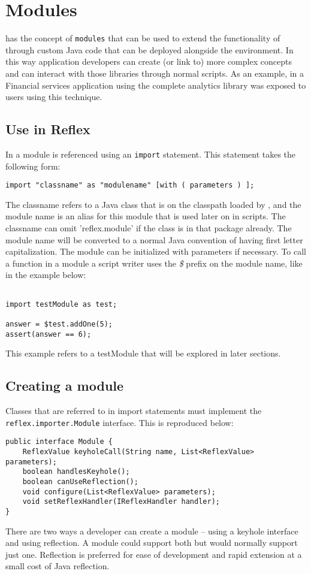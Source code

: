 \chapter{Modules}
\Reflex has the concept of \Verb+modules+ that can be used to extend the functionality of \Reflex through custom Java code that can be deployed alongside the environment. In this way application developers can create (or link to) more complex concepts and can interact with those libraries through normal \Reflex scripts. As an example, in a Financial services application using \Reflex the complete analytics library was exposed to \Reflex users using this technique.

\section{Use in Reflex}
In \Reflex a module is referenced using an \Verb+import+ statement. This statement takes the following form:
\begin{Verbatim}
import "classname" as "modulename" [with ( parameters ) ];
\end{Verbatim}

The classname refers to a Java class that is on the classpath loaded by \Reflex, and the module name is an alias for this module that is used later on in scripts. The classname can omit 'reflex.module' if the class is in that package already. The module name will be converted to a normal Java convention of having first letter capitalization. The module can be initialized with parameters if necessary. To call a function in a module a script writer uses the \emph{\$} prefix on the module name, like in the example below:

\begin{lstlisting}[caption={Module example}]

import testModule as test;

answer = $test.addOne(5);
assert(answer == 6);
\end{lstlisting}

This example refers to a testModule that will be explored in later sections.

\section{Creating a module}
Classes that are referred to in import statements must implement the \Verb+reflex.importer.Module+ interface. This is reproduced below:
\begin{lstlisting}[caption={Module interface}]
public interface Module {
    ReflexValue keyholeCall(String name, List<ReflexValue> parameters);
    boolean handlesKeyhole();
    boolean canUseReflection();
    void configure(List<ReflexValue> parameters);
    void setReflexHandler(IReflexHandler handler);
}
\end{lstlisting}
There are two ways a developer can create a module -- using a keyhole interface and using reflection. A module could support both but would normally support just one. Reflection is preferred for ease of development and rapid extension at a small cost of Java reflection.

